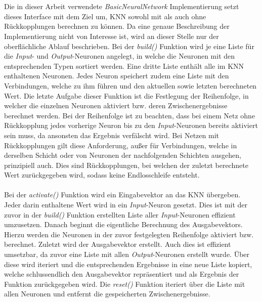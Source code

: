\\\\
Die in dieser Arbeit verwendete \emph{BasicNeuralNetwork} Implementierung setzt dieses Interface mit dem Ziel um, \ac{KNN} sowohl mit als auch ohne Rückkopplungen berechnen zu können. Da eine genaue Beschreibung der Implementierung nicht von Interesse ist, wird an dieser Stelle nur der oberflächliche Ablauf beschrieben. Bei der \emph{build()} Funktion wird je eine Liste für die \emph{Input}- und \emph{Output}-Neuronen angelegt, in welche die Neuronen mit den entsprechenden Typen sortiert werden. Eine dritte Liste enthält alle im \ac{KNN} enthaltenen Neuronen. Jedes Neuron speichert zudem eine Liste mit den Verbindungen, welche zu ihm führen und den aktuellen sowie letzten berechneten Wert. Die letzte Aufgabe dieser Funktion ist die Festlegung der Reihenfolge, in welcher die einzelnen Neuronen aktiviert bzw. deren Zwischenergebnisse berechnet werden. Bei der Reihenfolge ist zu beachten, dass bei einem Netz ohne Rückkopplung jedes vorherige Neuron bis zu den \emph{Input}-Neuronen bereits aktiviert sein muss, da ansonsten das Ergebnis verfälscht wird. Bei Netzen mit Rückkopplungen gilt diese Anforderung, außer für Verbindungen, welche in derselben Schicht oder von Neuronen der nachfolgenden Schichten ausgehen, prinzipiell auch. Dies sind Rückkopplungen, bei welchen der zuletzt berechnete Wert zurückgegeben wird, sodass keine Endlosschleife entsteht. 
\\\\
Bei der \emph{activate()} Funktion wird ein Eingabevektor an das \ac{KNN} übergeben. Jeder darin enthaltene Wert wird in ein \emph{Input}-Neuron gesetzt. Dies ist mit der zuvor in der \emph{build()} Funktion erstellten Liste aller \emph{Input}-Neuronen effizient umzusetzen. Danach beginnt die eigentliche Berechnung des Ausgabevektors. Hierzu werden die Neuronen in der zuvor festgelegten Reihenfolge aktiviert bzw. berechnet. Zuletzt wird der Ausgabevektor erstellt. Auch dies ist effizient umsetzbar, da zuvor eine Liste mit allen \emph{Output}-Neuronen erstellt wurde. Über diese wird iteriert und die entsprechenden Ergebnisse in eine neue Liste kopiert, welche schlussendlich den Ausgabevektor repräsentiert und als Ergebnis der Funktion zurückgegeben wird. Die \emph{reset()} Funktion iteriert über die Liste mit allen Neuronen und entfernt die gespeicherten Zwischenergebnisse. 


